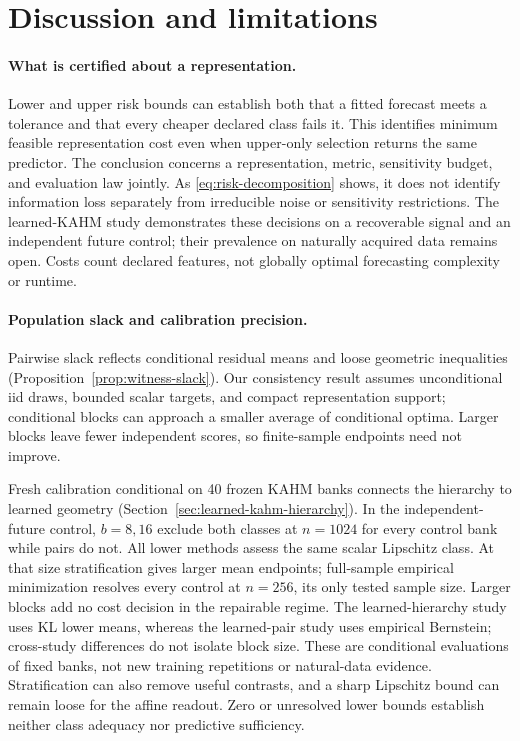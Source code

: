 \section{Discussion and limitations}
\label{sec:discussion}

\paragraph{What is certified about a representation.}
Lower and upper risk bounds can establish both that a fitted forecast meets a
tolerance and that every cheaper declared class fails it. This identifies
minimum feasible representation cost even when upper-only selection returns
the same predictor. The conclusion concerns a representation, metric,
sensitivity budget, and evaluation law jointly. As
\eqref{eq:risk-decomposition} shows, it does not identify information loss
separately from irreducible noise or sensitivity restrictions. The learned-KAHM
study demonstrates these decisions on a recoverable signal and an independent
future control; their prevalence on naturally acquired data remains open.
Costs count declared features, not globally optimal forecasting complexity
or runtime.

\paragraph{Population slack and calibration precision.}
Pairwise slack reflects conditional residual means and loose geometric
inequalities (Proposition~\ref{prop:witness-slack}). Our consistency result assumes
unconditional iid draws, bounded scalar targets, and compact representation
support; conditional blocks can approach a smaller average of conditional
optima. Larger blocks leave fewer independent scores, so finite-sample
endpoints need not improve.

Fresh calibration conditional on 40 frozen KAHM banks connects the hierarchy
to learned geometry (Section~\ref{sec:learned-kahm-hierarchy}). In the
independent-future control, $b=8,16$ exclude both classes at $n=1024$ for every
control bank while pairs do not. All lower methods assess the same scalar Lipschitz
class. At that size stratification gives larger mean endpoints; full-sample empirical
minimization resolves every control at $n=256$, its only tested sample size.
Larger blocks add no cost decision in the repairable regime. The learned-hierarchy
study uses KL lower means, whereas the learned-pair study uses empirical Bernstein;
cross-study differences do not isolate block size. These are conditional
evaluations of fixed banks, not new training repetitions or natural-data
evidence. Stratification can also remove useful contrasts, and a sharp
Lipschitz bound can remain loose for the affine readout. Zero or unresolved
lower bounds establish neither class adequacy nor predictive sufficiency.

